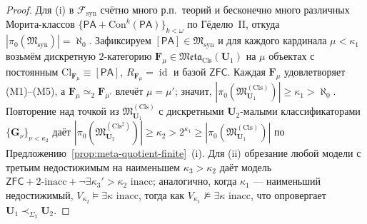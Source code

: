 \documentclass[11pt]{article}
\theoremstyle{plain}
\theoremstyle{definition}
\newcommand{\cF}{\mathcal{F}}
\newcommand{\fM}{\mathfrak{M}}
\newcommand{\Meta}{\mathfrak{Meta}}
\newcommand{\Cl}{\mathrm{Cl}}
\newcommand{\Con}{\mathrm{Con}}
\newcommand{\PA}{\mathsf{PA}}
\newcommand{\ZFC}{\mathsf{ZFC}}
\DeclareMathOperator{\id}{id}
\begin{document}
\begin{proof}
Для (i) в $\cF_{\mathrm{syn}}$ счётно много р.п.\ теорий и бесконечно много различных Морита-классов $\{\PA + \Con^k(\PA)\}_{k<\omega}$ по Гёделю~II, откуда $|\pi_0(\fM_{\mathrm{syn}})| = \aleph_0$. Зафиксируем $[\PA] \in \fM_{\mathrm{syn}}$ и для каждого кардинала $\mu < \kappa_1$ возьмём дискретную $2$-категорию $\mathbf{F}_\mu \in \Meta_{\mathrm{Cls}}(\mathbf{U}_1)$ на $\mu$ объектах с постоянным $\Cl_{\mathbf{F}_\mu} \equiv [\PA]$, $R_{\mathbf{F}_\mu} = \id$ и базой $\ZFC$. Каждая $\mathbf{F}_\mu$ удовлетворяет (M1)--(M5), а $\mathbf{F}_\mu \simeq_2 \mathbf{F}_{\mu'}$ влечёт $\mu = \mu'$; значит, $|\pi_0(\fM^{(\mathrm{Cls})}_{\mathbf{U}_1})| \ge \kappa_1 > \aleph_0$. Повторение над точкой из $\fM^{(\mathrm{Cls})}_{\mathbf{U}_1}$ с дискретными $\mathbf{U}_2$-малыми классификаторами $\{\mathbf{G}_\nu\}_{\nu < \kappa_2}$ даёт $|\pi_0(\fM^{(\mathrm{Cls}^2)}_{\mathbf{U}_2})| \ge \kappa_2 > 2^{\kappa_1} \ge |\pi_0(\fM^{(\mathrm{Cls})}_{\mathbf{U}_1})|$ по Предложению~\ref{prop:meta-quotient-finite}~(i). Для (ii) обрезание любой модели с третьим недостижимым на наименьшем $\kappa_3 > \kappa_2$ даёт модель $\ZFC + 2\text{-inacc} + \neg\exists \kappa_3' > \kappa_2\text{ inacc}$; аналогично, когда $\kappa_1$ — наименьший недостижимый, $V_{\kappa_2} \models \exists \kappa\text{ inacc}$, тогда как $V_{\kappa_1} \not\models \exists \kappa\text{ inacc}$, что опровергает $\mathbf{U}_1 \prec_{\Sigma_2} \mathbf{U}_2$.
\end{proof}
\end{document}
